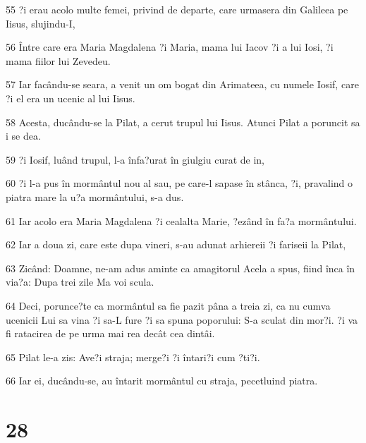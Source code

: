 \par 55 ?i erau acolo multe femei, privind de departe, care urmasera din Galileea pe Iisus, slujindu-I,
\par 56 Între care era Maria Magdalena ?i Maria, mama lui Iacov ?i a lui Iosi, ?i mama fiilor lui Zevedeu.
\par 57 Iar facându-se seara, a venit un om bogat din Arimateea, cu numele Iosif, care ?i el era un ucenic al lui Iisus.
\par 58 Acesta, ducându-se la Pilat, a cerut trupul lui Iisus. Atunci Pilat a poruncit sa i se dea.
\par 59 ?i Iosif, luând trupul, l-a înfa?urat în giulgiu curat de in,
\par 60 ?i l-a pus în mormântul nou al sau, pe care-l sapase în stânca, ?i, pravalind o piatra mare la u?a mormântului, s-a dus.
\par 61 Iar acolo era Maria Magdalena ?i cealalta Marie, ?ezând în fa?a mormântului.
\par 62 Iar a doua zi, care este dupa vineri, s-au adunat arhiereii ?i fariseii la Pilat,
\par 63 Zicând: Doamne, ne-am adus aminte ca amagitorul Acela a spus, fiind înca în via?a: Dupa trei zile Ma voi scula.
\par 64 Deci, porunce?te ca mormântul sa fie pazit pâna a treia zi, ca nu cumva ucenicii Lui sa vina ?i sa-L fure ?i sa spuna poporului: S-a sculat din mor?i. ?i va fi ratacirea de pe urma mai rea decât cea dintâi.
\par 65 Pilat le-a zis: Ave?i straja; merge?i ?i întari?i cum ?ti?i.
\par 66 Iar ei, ducându-se, au întarit mormântul cu straja, pecetluind piatra.

\chapter{28}

